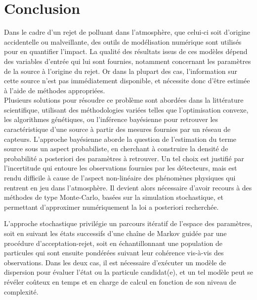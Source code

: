 \chapter{Conclusion}

Dans le cadre d'un rejet de polluant dans l'atmosphère, que celui-ci soit d'origine accidentelle ou malveillante, des outils de modélisation numérique sont utilisés pour en quantifier l'impact. La qualité des résultats issus de ces modèles dépend des variables d'entrée qui lui sont fournies, notamment concernant les paramètres de la source à l'origine du rejet. Or dans la plupart des cas, l'information sur cette source n'est pas immédiatement disponible, et nécessite donc d'être estimée à l'aide de méthodes appropriées. \\

Plusieurs solutions pour résoudre ce problème sont abordées dans la littérature scientifique, utilisant des méthodologies variées telles que l'optimisation convexe, les algorithmes génétiques, ou l'inférence bayésienne pour retrouver les caractéristique d'une source à partir des mesures fournies par un réseau de capteurs. L'approche bayésienne aborde la question de l'estimation du terme source sous un aspect probabiliste, en cherchant à construire la densité de probabilité a posteriori des paramètres à retrouver. Un tel choix est justifié par l'incertitude qui entoure les observations fournies par les détecteurs, mais est rendu difficile à cause de l'aspect non-linéaire des phénomènes physiques qui rentrent en jeu dans l'atmosphère. Il devient alors nécessaire d'avoir recours à des méthodes de type Monte-Carlo, basées sur la simulation stochastique, et permettant d'approximer numériquement la loi a posteriori recherchée. \\


L'approche stochastique privilégie un parcours itératif de l'espace des paramètres, soit en suivant les états successifs d'une chaîne de Markov guidée par une procédure d'acceptation-rejet, soit en échantillonnant une population de particules qui sont ensuite pondérées suivant leur cohérence vis-à-vis des observations. Dans les deux cas, il est nécessaire d'exécuter un modèle de dispersion pour évaluer l'état ou la particule candidat(e), et un tel modèle peut se révéler coûteux en temps et en charge de calcul en fonction de son niveau de complexité. \\

